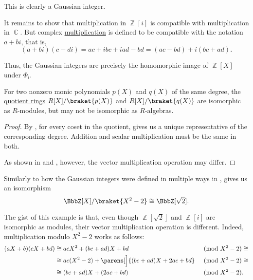 \begin{example}
\begin{thmenum}
    This is clearly a Gaussian integer.

    It remains to show that multiplication in \( \BbbZ[i] \) is compatible with multiplication in \( \BbbC \). But complex \hyperref[def:complex_numbers]{multiplication} is defined to be compatible with the notation \( a + bi \), that is,
    \begin{equation*}
    (a + bi) (c + di)
    =
    ac + ibc + iad - bd
    =
    (ac - bd) + i(bc + ad).
    \end{equation*}

    Thus, the Gaussian integers are precisely the homomorphic image of \( \BbbZ[X] \) under \( \Phi_i \).
  \end{thmenum}
\end{example}

\begin{corollary}\label{thm:polynomial_quotient_modules_vs_algebras}
  For two nonzero monic polynomials \( p(X) \) and \( q(X) \) of the same degree, the \hyperref[def:ring/quotient]{quotient rings} \( R[X] / \braket{ p(X) } \) and \( R[X] / \braket{ q(X) } \) are isomorphic as \( R \)-modules, but may not be isomorphic as \( R \)-algebras.
\end{corollary}
\begin{proof}
  By , for every coset in the quotient,  gives us a unique representative of the corresponding degree. Addition and scalar multiplication must be the same in both.

  As shown in  and , however, the vector multiplication operation may differ.
\end{proof}

\begin{example}\label{ex:integers_with_sqrt2}
  Similarly to how the Gaussian integers were defined in multiple ways in ,  gives us an isomorphism
  \begin{equation*}
    \BbbZ[X] / \braket{X^2 - 2} \cong \BbbZ[\sqrt 2].
  \end{equation*}

  The gist of this example is that, even though \( \BbbZ[\sqrt 2] \) and \( \BbbZ[i] \) are isomorphic as modules, their vector multiplication operation is different. Indeed, multiplication modulo \( X^2 - 2 \) works as follows:
  \begin{align*}
    (aX + b) (cX + bd)
    &\cong
    acX^2 + (bc + ad)X + bd
    &\pmod {X^2 - 2} \cong \\ &\cong
    ac(X^2 - 2) + \parens[\Big]{ (bc + ad)X + 2ac + bd }
    &\pmod {X^2 - 2} \cong \\ &\cong
    (bc + ad)X + (2ac + bd)
    &\pmod {X^2 - 2}. \phantom{\cong}
  \end{align*}
\end{example}
